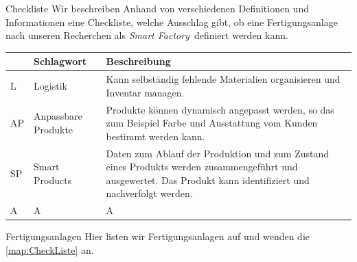 \documentclass{article}
\def\SmartFactory{\textcolor{DarkestGray}{\textit{Smart Factory}}}
\begin{document}
\begin{Map}{Checkliste}\label{map:CheckListe}
Wir beschreiben Anhand von verschiedenen Definitionen und Informationen eine Checkliste, welche Ausschlag gibt, ob eine Fertigungsanlage nach unseren Recherchen als \SmartFactory\ definiert werden kann.

\begin{tabular}{p{0.2cm}p{2.5cm}p{8cm}}\toprule
	& Schlagwort 
	& Beschreibung \\\midrule
	
	\label{CheckListe:Logistik}L 
	& Logistik 
	& Kann selbständig fehlende Materialien organisieren und Inventar managen.\cite{WasIndustrie40} \\\midrule
	
	\label{CheckListe:AnpassbareProdukte}AP 
	& Anpassbare Produkte 
	& Produkte können dynamisch angepasst werden, so das zum Beispiel Farbe und Ausstattung vom Kunden bestimmt werden kann.\cite{WasIndustrie40} \\\midrule
	
	\label{CheckListe:SmartProduct}SP
	& Smart Products
	& Daten zum Ablauf der Produktion und zum Zustand eines Produkts werden zusammengeführt und ausgewertet. Das Produkt kann identifiziert und nachverfolgt werden. \cite{Industrie40TippsUmsetzung} \\\midrule
	
	\label{CheckListe:ProduktDaten}A
	& A
	& A \\\bottomrule
	
\end{tabular}
\end{Map}

\begin{Map}{Fertigungsanlagen}
Hier listen wir Fertigungsanlagen auf und wenden die \ref{map:CheckListe} an.

\end{Map}
\end{document}
